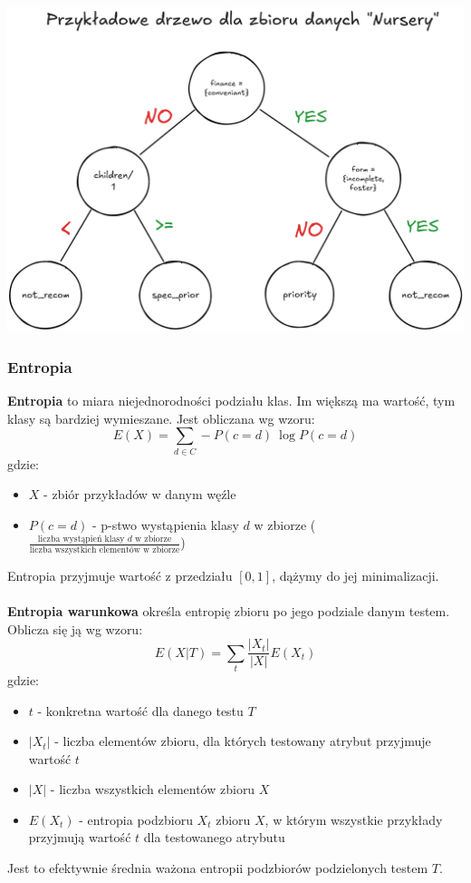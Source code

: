 \documentclass[11pt]{article}
\begin{document}
\begin{center}
\includegraphics[width=.8\linewidth]{./images/example-nursery-tree.png}
\end{center}

\pagebreak

\subsubsection{Entropia}
\label{ent}\textbf{Entropia} to miara niejednorodności podziału klas. Im większą ma wartość, tym klasy są bardziej wymieszane. Jest obliczana wg wzoru:
$$
E(X) = \sum_{d \in C} -P(c = d)\ \log P(c = d)
$$
gdzie:
\begin{itemize}
\item $X$ - zbiór przykładów w danym węźle
\item $P(c = d)$ - p-stwo wystąpienia klasy $d$ w zbiorze ($\frac{\text{liczba wystąpień klasy $d$ w zbiorze}}{\text{liczba wszystkich elementów w zbiorze}}$)
\end{itemize}
Entropia przyjmuje wartość z przedziału $[0,1]$, dążymy do jej minimalizacji.
\\\\
\label{entwar}\textbf{Entropia warunkowa} określa entropię zbioru po jego podziale danym testem. Oblicza się ją wg wzoru:
$$
E(X|T) = \sum_{t} \frac{|X_t|}{|X|} E(X_t)
$$
gdzie:
\begin{itemize}
\item $t$ - konkretna wartość dla danego testu $T$
\item $|X_t|$ - liczba elementów zbioru, dla których testowany atrybut przyjmuje wartość $t$
\item $|X|$ - liczba wszystkich elementów zbioru $X$
\item $E(X_t)$ - entropia podzbioru $X_t$ zbioru $X$, w którym wszystkie przykłady przyjmują wartość $t$ dla testowanego atrybutu
\end{itemize}
Jest to efektywnie średnia ważona entropii podzbiorów podzielonych testem $T$.
\end{document}
